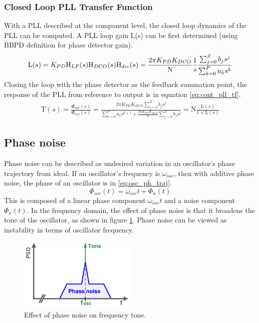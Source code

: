		\subsubsection{Closed Loop PLL Transfer Function}\label{cont_pll_tf}
			With a PLL described at the component level, the closed loop dynamics of the PLL can be computed. A PLL loop gain L(s) can be first determined (using BBPD definition for phase detector gain). 
			\begin{equation}
				\mathrm{L}(s) = K_{PD}\textnormal{H}_{LF}(s)\textnormal{H}_{DCO}(s)\textnormal{H}_{div}(s) = \frac{2\pi K_{PD}K_{DCO}}{\mathrm{N}}\frac{1}{s}\frac{\sum_{j=0}^Z b_js^j}{\sum_{k=0}^P a_ks^k}
			\end{equation}
			Closing the loop with the phase detector as the feedback summation point, the response of the PLL from reference to output is in equation \ref{eq:cont_pll_tf}.
			\begin{align} \label{eq:cont_pll_tf}
				\mathrm{T}(s) = \frac{\Phi_{out}(s)}{\Phi_{ref}(s)} = \frac{2\pi K_{PD}K_{DCO}\sum_{j=0}^Z b_js^j}{\sum_{k=0}^P a_ks^{k+1} + \frac{2\pi K_{PD}K_{DCO}}{\mathrm{N}}\sum_{j=0}^Z b_js^j} = \mathrm{N}\frac{\mathrm{L}(s)}{1 + \mathrm{L}(s)}
			\end{align}



	\subsection{Phase noise}
		Phase noise can be described as undesired variation in an oscillator's phase trajectory from ideal. If an oscillator's frequency is $\omega_{osc}$, then with additive phase noise, the phase of an oscillator is in \ref{eq:osc_ph_traj}. 
		\begin{equation}\label{eq:osc_ph_traj}
			\Phi_{osc}(t) = \omega_{osc}t + \Phi_n(t)
		\end{equation}
		This is composed of a linear phase component $\omega_{osc}t$ and a noise component $\Phi_n(t)$. In the frequency domain, the effect of phase noise is that it broadens the tone of the oscillator, as shown in figure \ref{fig:phase_noise_psd}. Phase noise can be viewed as instability in terms of oscillator frequency.
		\begin{figure}[htb!]
	        \centering
	        \includegraphics[width=0.5\textwidth, angle=0]{./figs/theory/phase_noise_psd}
		    \caption{Effect of phase noise on frequency tone.}
		    \label{fig:phase_noise_psd}
		\end{figure}

